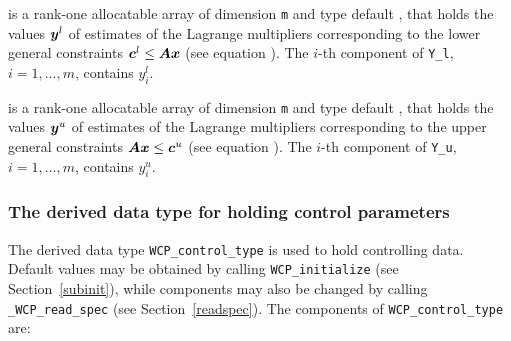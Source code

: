 \documentclass{galahad}
\newcommand{\packagename}{WCP}
\newcommand{\fullpackagename}{\libraryname\_\-\packagename}
\begin{document}
\begin{description}
 is a rank-one allocatable array of dimension {\tt m} and type default 
\realdp, that holds
the values ${\bm{y}}^{l}$ of estimates  of the Lagrange multipliers
corresponding to the lower general constraints ${\bm{c}}^{l} \leq {\bm{A}} {\bm{x}}$
(see equation ).
The $i$-th component of {\tt Y\_l}, $i = 1,  \ldots ,  m$, 
contains $y_{i}^{l}$.  

 is a rank-one allocatable array of dimension {\tt m} and type default 
\realdp, that holds
the values ${\bm{y}}^{u}$ of estimates  of the Lagrange multipliers
corresponding to the upper general constraints ${\bm{A}} {\bm{x}} \leq {\bm{c}}^{u}$
(see equation ).
The $i$-th component of {\tt Y\_u}, $i = 1,  \ldots ,  m$, 
contains $y_{i}^{u}$.  

\end{description}


\subsubsection{The derived data type for holding control 
 parameters}\label{typecontrol}
The derived data type 
{\tt \packagename\_control\_type} 
is used to hold controlling data. Default values may be obtained by calling 
{\tt \packagename\_initialize}
(see Section~\ref{subinit}),
while components may also be changed by calling 
{\tt \fullpackagename\_read\-\_spec}
(see Section~\ref{readspec}). 
The components of 
{\tt \packagename\_control\_type} 
are:
\end{document}
